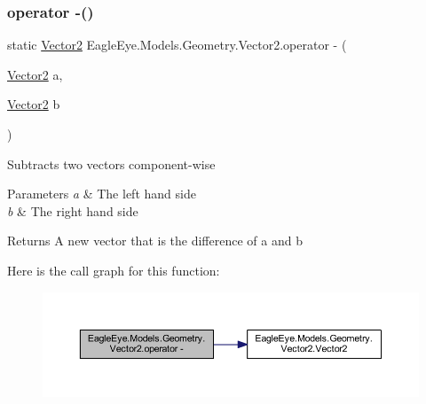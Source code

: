 \subsubsection{\texorpdfstring{operator -\/()}{operator -()}}
{\footnotesize\ttfamily static \mbox{\hyperlink{struct_eagle_eye_1_1_models_1_1_geometry_1_1_vector2}{Vector2}} Eagle\+Eye.\+Models.\+Geometry.\+Vector2.\+operator -\/ (\begin{DoxyParamCaption}\item[{\mbox{\hyperlink{struct_eagle_eye_1_1_models_1_1_geometry_1_1_vector2}{Vector2}}}]{a,  }\item[{\mbox{\hyperlink{struct_eagle_eye_1_1_models_1_1_geometry_1_1_vector2}{Vector2}}}]{b }\end{DoxyParamCaption})\hspace{0.3cm}{\ttfamily [static]}}



Subtracts two vectors component-\/wise 


\begin{DoxyParams}{Parameters}
{\em a} & The left hand side\\
\hline
{\em b} & The right hand side\\
\hline
\end{DoxyParams}
\begin{DoxyReturn}{Returns}
A new vector that is the difference of a and b
\end{DoxyReturn}
Here is the call graph for this function\+:\nopagebreak
\begin{figure}[H]
\begin{center}
\leavevmode
\includegraphics[width=350pt]{struct_eagle_eye_1_1_models_1_1_geometry_1_1_vector2_a349448334f4d2eb0c85774289baf399d_cgraph}
\end{center}
\end{figure}
\mbox{\label{struct_eagle_eye_1_1_models_1_1_geometry_1_1_vector2_a2fee5bfd7f9b9f9cafe352390bef52a3}} 
